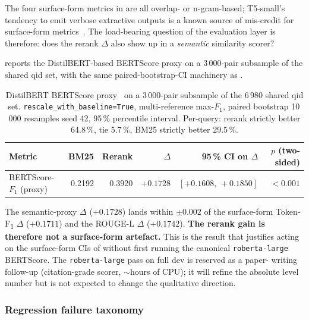 \documentclass[11pt,a4paper]{article}
\newcommand{\fdev}{6\,980}
\newcommand{\F}{F\textsubscript{1}}
\newcommand{\Tokenf}{Token-\F}
\newcommand{\rougel}{ROUGE-L}
\newcommand{\bertscore}{BERTScore}
\newcommand{\bmtwofive}{BM25}
\begin{document}
The four surface-form metrics in  are all overlap-
or n-gram-based; T5-small's tendency to emit verbose extractive
outputs is a known source of mis-credit for surface-form
metrics~\cite{lin2004rouge,papineni2002bleu}.  The load-bearing
question of the evaluation layer is therefore: does the rerank $\Delta$ also show up
in a \emph{semantic} similarity scorer?

 reports the DistilBERT-based \bertscore{}
proxy on a 3\,000-pair subsample of the shared qid set, with the
same paired-bootstrap-CI machinery as .

\begin{table}[H]
  \centering
  \caption{DistilBERT \bertscore{} proxy~\cite{zhang2020bertscore,sanh2019distilbert}
  on a 3\,000-pair subsample of the \fdev{} shared qid set.
  \texttt{rescale\_with\_baseline=True}, multi-reference max-$F_1$,
  paired bootstrap 10\,000 resamples seed 42, 95\,\% percentile
  interval.  Per-query: rerank strictly better 64.8\,\%, tie
  5.7\,\%, \bmtwofive{} strictly better 29.5\,\%.}
  \label{tab:w6-bertscore}
  \begin{tabular}{lrrrrr}
    \toprule
    Metric                       & \bmtwofive{} & Rerank & $\Delta$ & 95\,\% CI on $\Delta$ & $p$ (two-sided) \\
    \midrule
    \bertscore{}-$F_1$ (proxy)   & 0.2192       & 0.3920 & $\mathbf{+0.1728}$ & $[+0.1608,\,+0.1850]$ & $<0.001$ \\
    \bottomrule
  \end{tabular}
\end{table}

The semantic-proxy $\Delta$ ($+0.1728$) lands within $\pm 0.002$ of
the surface-form \Tokenf{} $\Delta$ ($+0.1711$) and the \rougel{}
$\Delta$ ($+0.1742$).  \textbf{The rerank gain is therefore not a
surface-form artefact.}  This is the result that justifies acting on
the surface-form CIs of  without first running the
canonical \texttt{roberta-large} \bertscore{}.  The
\texttt{roberta-large} pass on full dev is reserved as a paper-
writing follow-up (citation-grade scorer, $\sim\!$hours of CPU); it
will refine the absolute level number but is not expected to change
the qualitative direction.

\subsubsection{Regression failure taxonomy}
\label{sec:w6-taxonomy}
\end{document}
